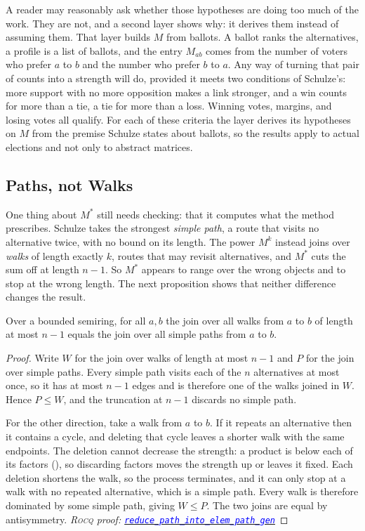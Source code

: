 \documentclass[a4paper,UKenglish,cleveref,autoref,thm-restate,anonymous]{lipics-v2021}
\newcommand{\Mstar}{M^{\ast}}
\newcommand{\rocq}{\textsc{Rocq}}
\newcommand{\anonrepo}{https://anonymous.4open.science/r/Semiring_graph_algorithm-000E}
\newcommand{\rocqfile}[2]{\href{\anonrepo/#1}{\textcolor{blue}{\texttt{#2}}}}
\newcommand{\proofat}[2]{{\footnotesize\itshape\rocq{} proof: \rocqfile{#1}{#2}}}
\begin{document}
A reader may reasonably ask whether those hypotheses are doing too much of
the work. They are not, and a second layer shows why: it derives them
instead of assuming them. That layer builds $M$ from ballots. A ballot ranks
the alternatives, a profile is a list of ballots, and the entry $M_{ab}$
comes from the number of voters who prefer $a$ to $b$ and the number who
prefer $b$ to $a$. Any way of turning that pair of counts into a strength
will do, provided it meets two conditions of Schulze's: more support with no
more opposition makes a link stronger, and a win counts for more than a tie,
a tie for more than a loss. Winning votes, margins, and losing votes all
qualify. For each of these criteria the layer derives its hypotheses on
$M$ from the premise Schulze states about ballots, so the results apply to
actual elections and not only to abstract matrices.


\subsection{Paths, not Walks}\label{sec:walks}

One thing about $\Mstar$ still needs checking: that it computes what the
method prescribes. Schulze takes the strongest \emph{simple path}, a route
that visits no alternative twice, with no bound on its length. The power
$M^{k}$ instead joins over \emph{walks} of length exactly $k$, routes that
may revisit alternatives, and $\Mstar$ cuts the sum off at length $n-1$.
So $\Mstar$ appears to range over the wrong objects and to stop at the
wrong length. The next proposition shows that neither difference changes
the result.

\begin{proposition}\label{prop:walks}
Over a bounded semiring, for all $a,b$ the join over all walks from $a$ to $b$
of length at most $n-1$ equals the join over all simple paths from $a$ to $b$.
\end{proposition}

\begin{proof}
Write $W$ for the join over walks of length at most $n-1$ and $P$ for the
join over simple paths. Every simple path visits each of the $n$ alternatives 
at most once, so it has
at most $n-1$ edges and is therefore one of the walks joined in $W$. Hence
$P \leq W$, and the truncation at $n-1$ discards no simple path.

For the other direction, take a walk from $a$ to $b$. If it repeats an
alternative then it contains a cycle, and deleting that cycle leaves a
shorter walk with the same endpoints. The deletion cannot decrease the
strength: a product is below each of its factors (), so
discarding factors moves the strength up or leaves it fixed. Each deletion
shortens the walk, so the process terminates, and it can only stop at a
walk with no repeated alternative, which is a simple path. Every walk is
therefore dominated by some simple path, giving $W \leq P$. The two joins
are equal by antisymmetry.
\proofat{algorithm/PathN.v}{reduce\_path\_\allowbreak into\_elem\_path\_gen}
\end{proof}
\end{document}

